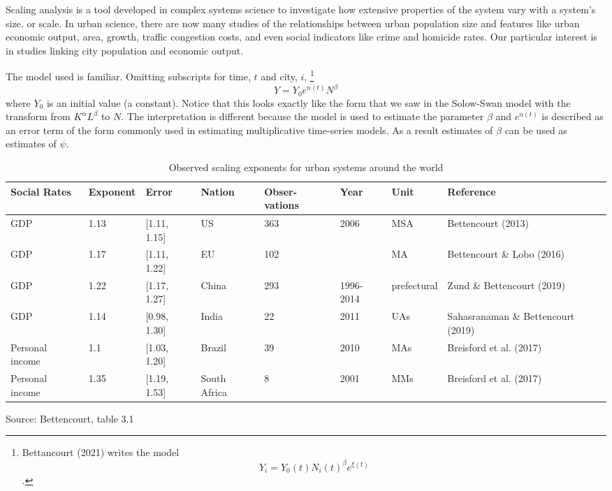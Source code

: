 Scaling analysis is a tool developed in complex systems science to investigate how extensive properties of the system vary with a system's size.  or scale.  In urban science, there are now many studies of  the relationships between urban population size and  features like urban economic output,  area, growth, traffic congestion costs, and even social  indicators like crime and homicide rates. Our particular interest is in studies linking city population  and  economic output. 

The model used is familiar. Omitting subscripts for time, $t$ and city, $i$, \footnote{Bettancourt (2021) writes the model \[Y_i = Y_0(t)N_i(t)^\beta e^{\xi(t)}\].}
\[Y = Y_0e^{n(t)}N^\beta\]
where $Y_0$ is an initial value (a constant). Notice that this looks exactly like the form that we saw in the 
\gls{Solow-Swan model} with the transform from $K^\alpha L^\beta$ to $N$.  The interpretation is different because the model is used to estimate the parameter $\beta$ and $e^{n(t)}$ is described  as an error term of the form commonly used in estimating multiplicative time-series models. As a result estimates of $\beta$  can be used as estimates  of $\psi$.

\begin{table}[htb]\small
\centering
\begin{tabular}{|p{1.5cm}|l|l|p{1.5cm}|p{1.4cm}|p{}|l|p{2.5cm}|}\hline
\textbf{Social Rates} & \textbf{Exponent} & \textbf{Error} & \textbf{Nation} & \textbf{Obser-vations} & \textbf{Year} & \textbf{Unit} & \textbf{Reference} \\ \hline   
GDP             & 1.13 & [1.11, 1.15]  & US           & 363 & 2006        & MSA  & Bettencourt (2013)                 \\ \hline
GDP             & 1.17 & [1.11, 1.22]  & EU           & 102 &             & MA   & Bettencourt  \& Lobo        (2016) \\ \hline
GDP             & 1.22 & [1.17, 1.27]  & China        & 293 & 1996-2014   & prefectural & Zund  \& Bettencourt (2019) \\ \hline
GDP             & 1.14 & [0.98, 1.30]  & India        & 22  & 2011        & UAs  & Sahasranaman \& Bettencourt (2019) \\ \hline
Personal income & 1.1  & [1.03, 1.20]  & Brazil       & 39  & 2010        & MAs  & Breisford et al.  (2017)           \\ \hline
Personal income & 1.35 & [1.19, 1.53]  & South Africa & 8   & 2001        & MMs  & Breisford et al.  (2017)           \\ \hline
\end{tabular}
\caption{Observed scaling exponents for urban systems around the world}
\label{table-scaling-exponents}
\small Source: Bettencourt, table 3.1
\end{table}

